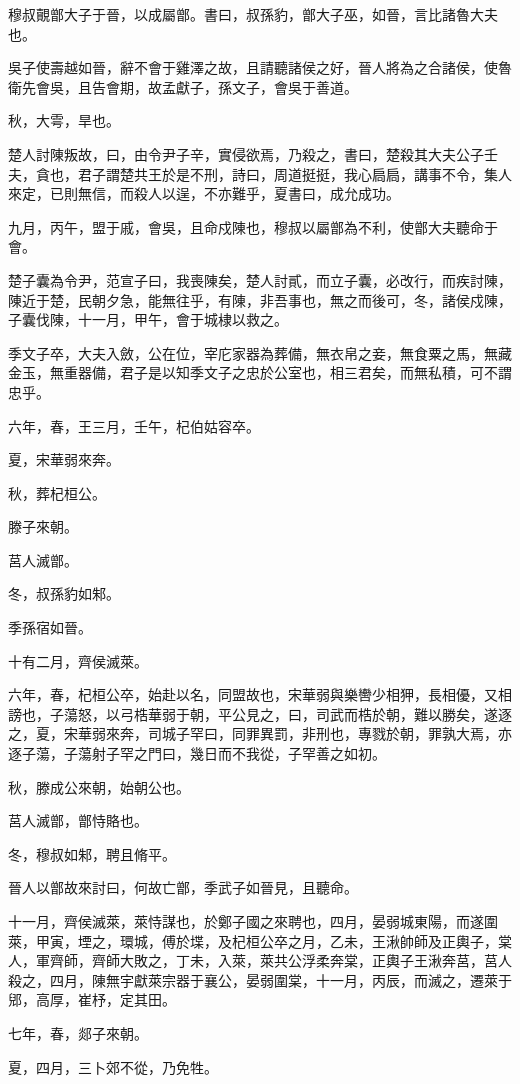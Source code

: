 \begin{pinyinscope}
穆叔覿鄫大子于晉，以成屬鄫。書曰，叔孫豹，鄫大子巫，如晉，言比諸魯大夫也。

吳子使壽越如晉，辭不會于雞澤之故，且請聽諸侯之好，晉人將為之合諸侯，使魯衛先會吳，且告會期，故孟獻子，孫文子，會吳于善道。

秋，大雩，旱也。

楚人討陳叛故，曰，由令尹子辛，實侵欲焉，乃殺之，書曰，楚殺其大夫公子壬夫，貪也，君子謂楚共王於是不刑，詩曰，周道挺挺，我心扃扃，講事不令，集人來定，已則無信，而殺人以逞，不亦難乎，夏書曰，成允成功。

九月，丙午，盟于戚，會吳，且命戍陳也，穆叔以屬鄫為不利，使鄫大夫聽命于會。

楚子囊為令尹，范宣子曰，我喪陳矣，楚人討貳，而立子囊，必改行，而疾討陳，陳近于楚，民朝夕急，能無往乎，有陳，非吾事也，無之而後可，冬，諸侯戍陳，子囊伐陳，十一月，甲午，會于城棣以救之。

季文子卒，大夫入斂，公在位，宰庀家器為葬備，無衣帛之妾，無食粟之馬，無藏金玉，無重器備，君子是以知季文子之忠於公室也，相三君矣，而無私積，可不謂忠乎。

六年，春，王三月，壬午，杞伯姑容卒。

夏，宋華弱來奔。

秋，葬杞桓公。

滕子來朝。

莒人滅鄫。

冬，叔孫豹如邾。

季孫宿如晉。

十有二月，齊侯滅萊。

六年，春，杞桓公卒，始赴以名，同盟故也，宋華弱與樂轡少相狎，長相優，又相謗也，子蕩怒，以弓梏華弱于朝，平公見之，曰，司武而梏於朝，難以勝矣，遂逐之，夏，宋華弱來奔，司城子罕曰，同罪異罰，非刑也，專戮於朝，罪孰大焉，亦逐子蕩，子蕩射子罕之門曰，幾日而不我從，子罕善之如初。

秋，滕成公來朝，始朝公也。

莒人滅鄫，鄫恃賂也。

冬，穆叔如邾，聘且脩平。

晉人以鄫故來討曰，何故亡鄫，季武子如晉見，且聽命。

十一月，齊侯滅萊，萊恃謀也，於鄭子國之來聘也，四月，晏弱城東陽，而遂圍萊，甲寅，堙之，環城，傅於堞，及杞桓公卒之月，乙未，王湫帥師及正輿子，棠人，軍齊師，齊師大敗之，丁未，入萊，萊共公浮柔奔棠，正輿子王湫奔莒，莒人殺之，四月，陳無宇獻萊宗器于襄公，晏弱圍棠，十一月，丙辰，而滅之，遷萊于郳，高厚，崔杼，定其田。

七年，春，郯子來朝。

夏，四月，三卜郊不從，乃免牲。


\end{pinyinscope}
